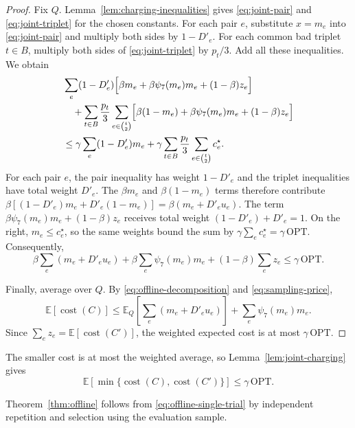 \documentclass[11pt]{article}
\theoremstyle{definition}
\theoremstyle{remark}
\newcommand{\1}{\mathbf{1}}
\begin{document}
\begin{proof}
Fix $Q$. Lemma~\ref{lem:charging-inequalities} gives
\eqref{eq:joint-pair} and \eqref{eq:joint-triplet} for the
chosen constants. For each pair $e$, substitute $x=m_e$ into
\eqref{eq:joint-pair} and multiply both sides by $1-D'_e$.
For each common bad triplet $t\in B$, multiply both sides
of \eqref{eq:joint-triplet} by $p_t/3$.
Add all these inequalities. We obtain
\begin{align*}
    &\sum_e(1-D'_e)
      \Bigl[\beta m_e+\beta\psi_7(m_e)m_e+(1-\beta)z_e\Bigr]\\
    &\quad+
      \sum_{t\in B}\frac{p_t}{3}
      \sum_{e\in\binom{t}{2}}
      \Bigl[\beta(1-m_e)+\beta\psi_7(m_e)m_e
            +(1-\beta)z_e\Bigr]\\
    &\leq
      \gamma\sum_e(1-D'_e)m_e
      +\gamma\sum_{t\in B}\frac{p_t}{3}
       \sum_{e\in\binom{t}{2}}c_e^\star.
\end{align*}
For each pair $e$, the pair inequality has weight $1-D'_e$
and the triplet inequalities have total weight $D'_e$. The
$\beta m_e$ and $\beta(1-m_e)$ terms therefore contribute
$\beta[(1-D'_e)m_e+D'_e(1-m_e)]=\beta(m_e+D'_eu_e)$.
The term $\beta\psi_7(m_e)m_e+(1-\beta)z_e$ receives total
weight $(1-D'_e)+D'_e=1$. On the right, $m_e\leq c_e^\star$,
so the same weights bound the sum by $\gamma\sum_e c_e^\star
=\gamma\,\mathrm{OPT}$.
Consequently,
\[
    \beta\sum_e(m_e+D'_eu_e)
    +\beta\sum_e\psi_7(m_e)m_e
    +(1-\beta)\sum_e z_e
    \leq\gamma\,\mathrm{OPT}.
\]

Finally, average over $Q$. By
\eqref{eq:offline-decomposition} and \eqref{eq:sampling-price},
\[
    \mathbb E[\operatorname{cost}(C)]
    \leq \mathbb E_Q\!\left[\sum_e(m_e+D'_eu_e)\right]
        +\sum_e\psi_7(m_e)m_e.
\]
Since $\sum_e z_e=\mathbb E[\operatorname{cost}(C')]$,
the weighted expected cost is at most $\gamma\,\mathrm{OPT}$.
\end{proof}

The smaller cost is at most the weighted average, so
Lemma~\ref{lem:joint-charging} gives
\begin{equation}
    \mathbb E\!\left[
        \min\{\operatorname{cost}(C),\operatorname{cost}(C')\}
    \right]\leq\gamma\,\mathrm{OPT}.
    \label{eq:offline-single-trial}
\end{equation}

Theorem~\ref{thm:offline} follows from \eqref{eq:offline-single-trial}
by independent repetition and selection using the evaluation sample.
\end{document}
